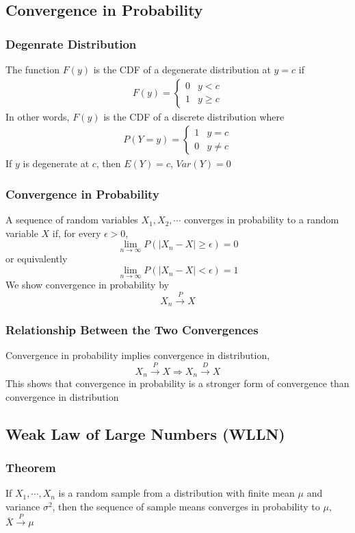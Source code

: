 \documentclass[11pt]{article}
\begin{document}
\subsection{Convergence in Probability}
\subsubsection{Degenrate Distribution}
The function $F(y)$ is the CDF of a degenerate distribution at $y=c$ if 
\begin{align*}
    F(y) = 
    \begin{cases}
        0 & y<c \\
        1 & y\geq c
    \end{cases}
\end{align*}
In other words, $F(y)$ is the CDF of a discrete distribution where 
\begin{align*}
    P(Y=y) = 
    \begin{cases}
        1 & y=c \\
        0 & y\neq c
    \end{cases}
\end{align*}
If $y$ is degenerate at $c$, then $E(Y)=c$, $Var(Y)=0$
\subsubsection{Convergence in Probability}
A sequence of random variables $X_1,X_2,\cdots$ converges in probability to a random variable $X$ if, 
for every $\epsilon>0$,
\[\lim_{n\to\infty}P(|X_n-X|\geq\epsilon)=0\]
or equivalently
\[\lim_{n\to\infty}P(|X_n-X|<\epsilon)=1\]
We show convergence in probability by
\[X_n\overset{P}{\rightarrow}X\]
\subsubsection{Relationship Between the Two Convergences}
Convergence in probability implies convergence in distribution, 
\[X_n\overset{P}{\rightarrow}X\Rightarrow X_n\overset{D}{\rightarrow}X\]
This shows that convergence in probability is a stronger form of convergence than convergence in distribution
\subsection{Weak Law of Large Numbers (WLLN)}
\subsubsection{Theorem}
If $X_1,\cdots,X_n$ is a random sample from a distribution with finite mean $\mu$ and variance $\sigma^2$, 
then the sequence of sample means converges in probability to $\mu$, $\overline{X}\overset{P}{\rightarrow}\mu$
\end{document}
